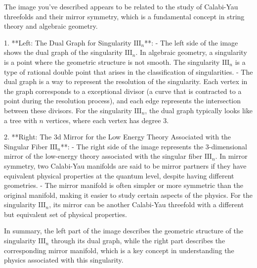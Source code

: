 The image you've described appears to be related to the study of Calabi-Yau threefolds and their mirror symmetry, which is a fundamental concept in string theory and algebraic geometry.

1. **Left: The Dual Graph for Singularity \( \text{III}_n \)**:
   - The left side of the image shows the dual graph of the singularity \( \text{III}_n \). In algebraic geometry, a singularity is a point where the geometric structure is not smooth. The singularity \( \text{III}_n \) is a type of rational double point that arises in the classification of singularities.
   - The dual graph is a way to represent the resolution of the singularity. Each vertex in the graph corresponds to a exceptional divisor (a curve that is contracted to a point during the resolution process), and each edge represents the intersection between these divisors. For the singularity \( \text{III}_n \), the dual graph typically looks like a tree with \( n \) vertices, where each vertex has degree 3.

2. **Right: The 3d Mirror for the Low Energy Theory Associated with the Singular Fiber \( \text{III}_n \)**:
   - The right side of the image represents the 3-dimensional mirror of the low-energy theory associated with the singular fiber \( \text{III}_n \). In mirror symmetry, two Calabi-Yau manifolds are said to be mirror partners if they have equivalent physical properties at the quantum level, despite having different geometries.
   - The mirror manifold is often simpler or more symmetric than the original manifold, making it easier to study certain aspects of the physics. For the singularity \( \text{III}_n \), its mirror can be another Calabi-Yau threefold with a different but equivalent set of physical properties.

In summary, the left part of the image describes the geometric structure of the singularity \( \text{III}_n \) through its dual graph, while the right part describes the corresponding mirror manifold, which is a key concept in understanding the physics associated with this singularity.